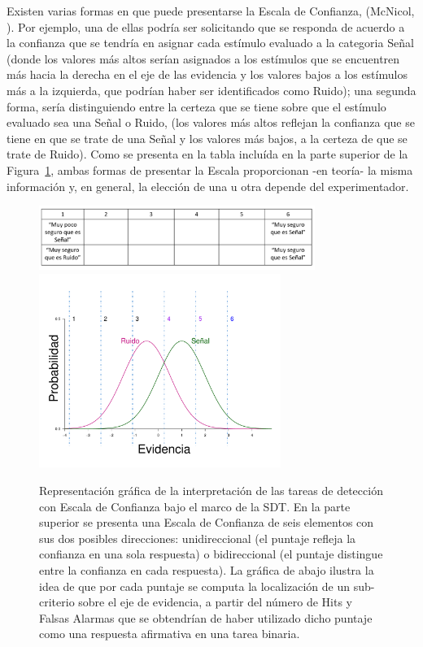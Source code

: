\begin{itemize}
Existen varias formas en que puede presentarse la Escala de Confianza, (McNicol, \citeyear{McNicol2}). Por ejemplo, una de ellas podría ser solicitando que se responda de acuerdo a la confianza que se tendría en asignar cada estímulo evaluado a la categoria Señal (donde los valores más altos serían asignados a los estímulos que se encuentren más hacia la derecha en el eje de las evidencia y los valores bajos a los estímulos más a la izquierda, que podrían haber ser identificados como Ruido); una segunda forma, sería distinguiendo entre la certeza que se tiene sobre que el estímulo evaluado sea una Señal o Ruido, (los valores más altos reflejan la confianza que se tiene en que se trate de una Señal y los valores más bajos, a la certeza de que se trate de Ruido). Como se presenta en la tabla incluída en la parte superior de la Figura~\ref{fig:Conf_Rat}, ambas formas de presentar la Escala proporcionan -en teoría- la misma información y, en general, la elección de una u otra depende del experimentador.\\

\begin{figure}[th]
\centering
\includegraphics[width=0.80\textwidth]{Figures/Puntajes_Criterios}\\
\includegraphics[width=0.70\textwidth]{Figures/ConfidenceRating}\\
\caption[Representación gráfica de la interpretación de las tareas de detección con Escala de Confianza]{Representación gráfica de la interpretación de las tareas de detección con Escala de Confianza bajo el marco de la SDT. En la parte superior se presenta una Escala de Confianza de seis elementos con sus dos posibles direcciones: unidireccional (el puntaje refleja la confianza en una sola respuesta) o bidireccional (el puntaje distingue entre la confianza en cada respuesta). La gráfica de abajo ilustra la idea de que por cada puntaje se computa la localización de un sub-criterio sobre el eje de evidencia, a partir del número de Hits y Falsas Alarmas que se obtendrían de haber utilizado dicho puntaje como una respuesta afirmativa en una tarea binaria.}
\label{fig:Conf_Rat}
\end{figure}


\end{itemize}
